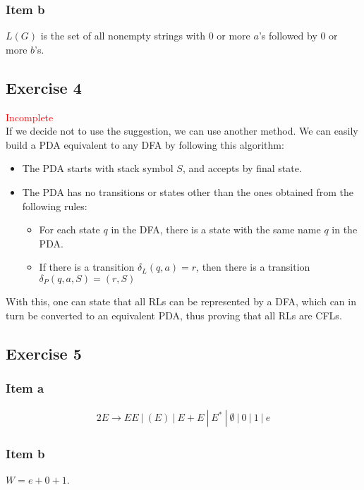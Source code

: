 {\subsubsection{Item b}
$L(G)$ is the set of all nonempty strings with 0 or more $a$'s followed by 0 or more $b$'s.
\subsection{Exercise 4}
\textcolor{red}{Incomplete}\\
If we decide not to use the suggestion, we can use another method. We can easily build a PDA equivalent to any DFA by following this algorithm:
\begin{itemize}
	\item The PDA starts with stack symbol $S$, and accepts by final state.
	\item The PDA has no transitions or states other than the ones obtained from the following rules:
	\begin{itemize}
		\item For each state $q$ in the DFA, there is a state with the same name $q$ in the PDA.
		\item If there is a transition $\delta_L(q,a)=r$, then there is a transition $\delta_P(q,a,S)=(r,S)$
	\end{itemize}
\end{itemize}
With this, one can state that all RLs can be represented by a DFA, which can in turn be converted to an equivalent PDA, thus proving that all RLs are CFLs.
\pagebreak
\subsection{Exercise 5}
\subsubsection{Item a}
\begin{alignat*}{2}
	E \rightarrow EE~|~(E)~|~E+E~|~E^*~|~\emptyset~|~0~|~1~|~e
\end{alignat*}
\subsubsection{Item b}
$W=e+0+1$.\\
\begin{minipage}[t]{0.49\textwidth}
\begin{center}
\end{center}
\end{minipage}%
\begin{minipage}[t]{0.49\textwidth}
\begin{center}
\end{center}
\end{minipage}
}
